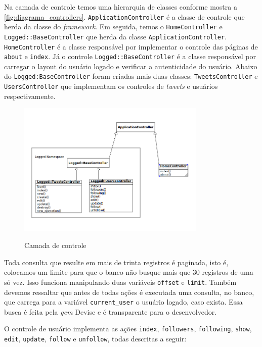 Na camada de controle temos uma hierarquia de classes conforme mostra a \autoref{fig:diagrama_controllers}. \verb|ApplicationController| é a classe de controle que herda da classe do \textit{framework}. Em seguida, temos o \verb|HomeController| e \verb|Logged::BaseController| que herda  da classe \verb|ApplicationController|. \verb|HomeController| é a classe responsável por implementar o controle das páginas de \verb|about| e \verb|index|. Já o controle \verb|Logged::BaseController| é a classe responsável por carregar o layout do usuário logado e verificar a autenticidade do usuário.
Abaixo do \verb|Logged:BaseController| foram criadas mais duas classes: \verb|TweetsController| e \verb|UsersController| que implementam os controles de \textit{tweets} e usuários respectivamente.
\begin{figure}[H]
    \centering
    \caption{Camada de controle}
    \includegraphics[width=0.8\textwidth]{./04-figuras/controllers_complete.png}
    \label{fig:diagrama_controllers}
\end{figure}

Toda consulta que resulte em mais de trinta registros é paginada, isto é, colocamos um limite para que o banco não busque mais que 30 registros de uma só vez. Isso funciona manipulando duas variáveis \verb|offset| e \verb|limit|. Também devemos ressaltar que
antes de todas ações é executada uma consulta, no banco, que carrega para a variável \verb|current_user| o usuário logado, caso exista. Essa busca é feita pela \textit{gem} Devise e é transparente para o desenvolvedor.

O controle de usuário implementa as ações \verb|index|, \verb|followers|, \verb|following|, \verb|show|, \verb|edit|, \verb|update|, \verb|follow| e \verb|unfollow|, todas descritas a seguir:

